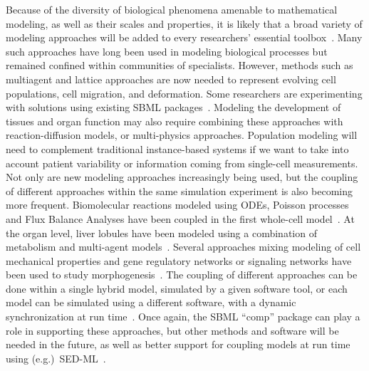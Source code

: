 \documentclass[]{draft-sbml-paper}
\begin{document}
Because of the diversity of biological phenomena amenable to mathematical modeling, as well as their scales and properties, it is likely that a broad variety of modeling approaches will be added to every researchers' essential toolbox~\citep{Cvijovic2014bridging}. Many such approaches have long been used in modeling biological processes but remained confined within communities of specialists. However, methods such as multiagent and lattice approaches are now needed to represent evolving cell populations, cell migration, and deformation. Some researchers are experimenting with solutions using existing SBML packages~\citep{watanabe2016efficient, varela2018epilog}.  Modeling the development of tissues and organ function may also require combining these approaches with reaction-diffusion models, or multi-physics approaches. Population modeling will need to complement traditional instance-based systems if we want to take into account patient variability or information coming from single-cell measurements. Not only are new modeling approaches increasingly being used, but the coupling of different approaches within the same simulation experiment is also becoming more frequent. Biomolecular reactions modeled using ODEs, Poisson processes and Flux Balance Analyses have been coupled in the first whole-cell model~\citep{Karr2012a, Karr2015principles}. At the organ level, liver lobules have been modeled using a combination of metabolism and multi-agent models~\citep{schliess2014integrated}. Several approaches mixing modeling of cell mechanical properties and gene regulatory networks or signaling networks have been used to study morphogenesis~\citep{tanaka2015lbibcell, delile2017cell}. The coupling of different approaches can be done within a single hybrid model, simulated by a given software tool, or each model can be simulated using a different software, with a dynamic synchronization at run time~\citep{mattioni2013integration}.  Once again, the SBML ``comp'' package can play a role in supporting these approaches, but other methods and software will be needed in the future, as well as better support for coupling models at run time using (e.g.)\ SED-ML~\citep{waltemath2011reproducible, Kohn2008sedml}.
\end{document}
